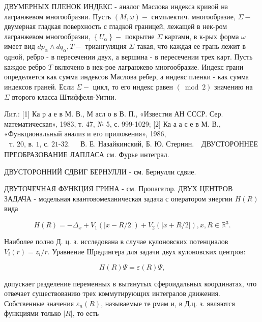 \documentclass[10pt]{article}
\begin{document}
ДВУМЕРНЫХ ПЛЕНОК ИНДЕКС - аналог Маслова индекса кривой на лагранжевом многообразии. Пусть $(M, \omega)-$ симплектич. многообразие, $\Sigma-$ двумерная гладкая поверхность с гладкой границей, лежащей в нек-ром лагранжевом многообразии, $\left\{U_{\alpha}\right\}-$ покрытие $\Sigma$ картами, в к-рых форма $\omega$ имеет вид $d p_{\alpha} \wedge d q_{\alpha}, T-$ триангуляция $\Sigma$ такая, что каждая ее грань лежит в одной, ребро - в пересечении двух, а вершина - в пересечении трех карт. Пусть каждое ребро $T$ включено в нек-рое лагранжево многообразие. Индекс грани определяется как сумма индексов Маслова ребер, а индекс пленки - как сумма индексов граней. Если $\Sigma-$ цикл, то его индекс равен $(\bmod 2)$ значению на $\Sigma$ второго класса Штиффеля-Уитни.



Лит.: [1] Ка р а е в М. В., М асл о в В. П., «Известия АН СССР. Сер. математическая», 1983, т. 47, № 5, с. 999-1029; [2] Ка а а с е в М. В., «Функциональный анализ и его приложения», 1986, $\begin{array}{ll}\text { т. 20, в. 1, с. 21-32. } & \text { В. Е. Назайкинский, Б. Ю. Стернин. }\end{array}$ ДВУСТОРОННЕЕ ПРЕОБРАЗОВАНИЕ ЛАПЛАСА см. Фурье интеграл.



ДВУСТОРОННИЙ СДВИГ БЕРНУЛЛИ - см. Бернулли сдвие.



ДВУТОЧЕЧНАЯ ФУНКЦИЯ ГРИНА - см. Пропагатор. ДВУХ ЦЕНТРОВ ЗАДАЧА - модельная квантовомеханическая задача с оператором энергии $H(R)$ вида



\[

H(R)=-\Delta_{x}+V_{1}(|x-R / 2|)+V_{2}(|x+R / 2|), x, R \in \mathbb{R}^{3} .

\]



Наиболее полно Д. ц. з. исследована в случае кулоновских потенциалов $V_{i}(r)=z_{i} / r$. Уравнение Шредингера для задачи двух кулоновских центров:



\[

H(R) \Psi=\varepsilon(R) \Psi,

\]



допускает разделение переменных в вытянутых сфероидальных координатах, что отвечает существованию трех коммутирующих интегралов движения. Собственные значения $\varepsilon_{n}(R)$, называемые те рмам и, в Д.ц. з. являются функциями только $|R|$, то есть
\end{document}
